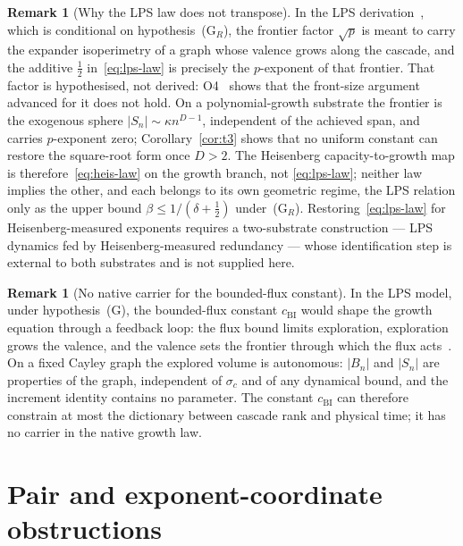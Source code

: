 \documentclass[11pt,a4paper]{article}
\theoremstyle{definition}
\newtheorem{remark}[theorem]{Remark}
\newcommand{\cBI}{c_{\mathrm{BI}}}
\begin{document}
\begin{remark}[Why the LPS law does not transpose]
  \label{rem:lps}
  In the LPS derivation~\cite{Beau2026a10}, which is conditional on hypothesis~(G$_R$), the frontier factor
  $\sqrt{p}$ is meant to carry the expander isoperimetry of a graph whose valence grows along the cascade,
  and the additive $\tfrac{1}{2}$ in~\eqref{eq:lps-law} is precisely the $p$-exponent of that frontier.
  That factor is hypothesised, not derived: O4~\cite{Beau2026a8} shows that the front-size argument
  advanced for it does not hold.
  On a polynomial-growth substrate the frontier is the exogenous sphere $|S_n| \sim \kappa n^{D-1}$,
  independent of the achieved span, and carries $p$-exponent zero; Corollary~\ref{cor:t3} shows that no
  uniform constant can restore the square-root form once $D > 2$.
  The Heisenberg capacity-to-growth map is therefore~\eqref{eq:heis-law} on the growth branch, not
  \eqref{eq:lps-law}; neither law implies the other, and each belongs to its own geometric regime, the LPS
  relation only as the upper bound $\beta \le 1/(\delta + \tfrac12)$ under~(G$_R$).
  Restoring~\eqref{eq:lps-law} for Heisenberg-measured exponents requires a two-substrate construction ---
  LPS dynamics fed by Heisenberg-measured redundancy --- whose identification step is external to both
  substrates and is not supplied here.
\end{remark}

\begin{remark}[No native carrier for the bounded-flux constant]
  \label{rem:bi}
  In the LPS model, under hypothesis~(G), the bounded-flux constant $\cBI$ would shape the growth equation
  through a feedback loop: the flux bound limits exploration, exploration grows the valence, and the valence
  sets the frontier through which the flux acts~\cite{Beau2026a8}.
  On a fixed Cayley graph the explored volume is autonomous: $|B_n|$ and $|S_n|$ are properties of the
  graph, independent of $\sigma_c$ and of any dynamical bound, and the increment identity contains no
  parameter.
  The constant $\cBI$ can therefore constrain at most the dictionary between cascade rank and physical
  time; it has no carrier in the native growth law.
\end{remark}

\section{Pair and exponent-coordinate obstructions}
\label{sec:obstructions}
\end{document}

